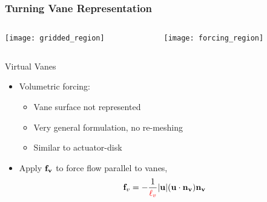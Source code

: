 \documentclass[mathserif]{beamer}
\begin{document}
%
%
%
\begin{frame}
\frametitle{Turning Vane Representation}

\begin{columns}[]
  \begin{column}{0.5\linewidth}

   \begin{center}
    \texttt{[image: gridded\_region]}
   \end{center}

  \end{column}

  \begin{column}{0.5\linewidth}
   \begin{center}
    \texttt{[image: forcing\_region]}
   \end{center}

  \end{column}
\end{columns}


 \begin{block}{Virtual Vanes}

  \begin{itemize}
   \item Volumetric forcing: 
	 \begin{itemize}
	  \item Vane surface not represented
	  \item Very general formulation, no re-meshing 
	  \item Similar to actuator-disk
	 \end{itemize}	 
%  
   \item Apply ${\bf f_v}$ to force flow parallel to vanes,
	 \begin{equation}
	  {\bf f}_v= -\frac{1}{\textcolor{red}{\ell_v}}|{\bf u}|({\bf u}\cdot{\bf n_v}){\bf n_v}
	 \end{equation}
  \end{itemize}
 \end{block}

\end{frame}
\end{document}

